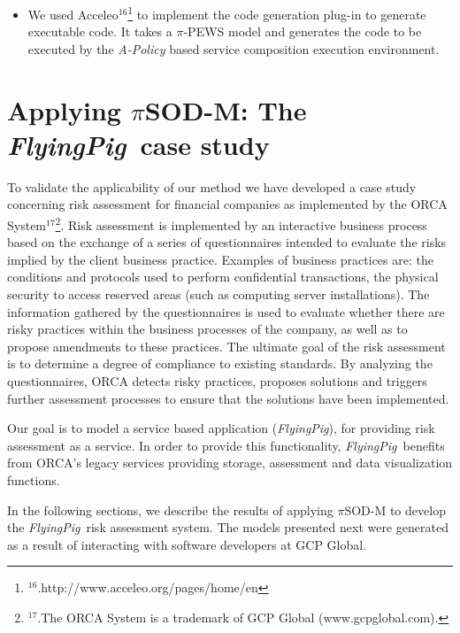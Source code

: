\documentclass[12pt,twoside]{article}
\theoremstyle{plain}
\theoremstyle{plain}
\newcommand{\pisodm}[0]{$\pi$SOD-M\xspace}
\def\FlyingPig{\textsl{FlyingPig}\xspace}
\begin{document}
\begin{multicols}{2}
\begin{itemize}
\item 	We  used Acceleo$^{16}$\footnote{$^{16}$.http://www.acceleo.org/pages/home/en} to implement  the code generation plug-in to generate executable code. 
It takes a $\pi$-PEWS model and generates the code to be executed by the {\em
A-Policy} based service composition execution environment.
\end{itemize}


\section{Applying \pisodm: The \FlyingPig\ case study}
\label{sec:flyingPig}


To validate the applicability of our method we have developed a case study concerning risk assessment for financial companies as implemented by the ORCA System$^{17}$\footnote{$^{17}$.The ORCA System is a trademark of GCP Global (www.gcpglobal.com).}.
Risk assessment is implemented by an interactive business process based on the exchange of a series of questionnaires intended to evaluate the risks implied by the client business practice.
Examples of business practices are: the conditions and protocols used to perform confidential transactions, the physical security to access reserved areas (such as computing server installations).
The information gathered by the questionnaires is used to evaluate whether there are risky practices within the business processes of the company, as well as to propose amendments to these practices.
The ultimate goal of the risk assessment is to determine a degree of compliance to existing standards.
By analyzing the questionnaires, ORCA detects risky practices, proposes solutions and triggers further assessment processes to ensure that the solutions have been implemented.

Our goal is to model a service based application (\FlyingPig), for providing risk assessment as a service.
In order to provide this functionality, \FlyingPig\ benefits from ORCA's legacy services providing storage, assessment and data visualization functions.

In the following sections, we describe the results of applying \pisodm to develop the \FlyingPig\ risk assessment system.
The models presented next were generated as a result of interacting with software developers at GCP Global.


\end{multicols}
\end{document}

